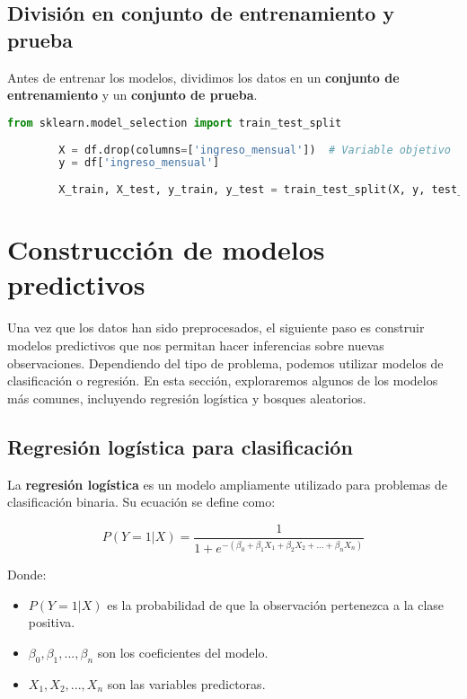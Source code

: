 \documentclass{book}
\begin{document}
	\subsection{División en conjunto de entrenamiento y prueba}
	
	Antes de entrenar los modelos, dividimos los datos en un \textbf{conjunto de entrenamiento} y un \textbf{conjunto de prueba}.
	
	\begin{lstlisting}[language=Python, caption=División en entrenamiento y prueba]
		from sklearn.model_selection import train_test_split
		
		X = df.drop(columns=['ingreso_mensual'])  # Variable objetivo
		y = df['ingreso_mensual']
		
		X_train, X_test, y_train, y_test = train_test_split(X, y, test_size=0.2, random_state=42)
	\end{lstlisting}
	
	\section{Construcción de modelos predictivos}
	
	Una vez que los datos han sido preprocesados, el siguiente paso es construir modelos predictivos que nos permitan hacer inferencias sobre nuevas observaciones. Dependiendo del tipo de problema, podemos utilizar modelos de clasificación o regresión. En esta sección, exploraremos algunos de los modelos más comunes, incluyendo regresión logística y bosques aleatorios.
	
	\subsection{Regresión logística para clasificación}
	
	La \textbf{regresión logística} es un modelo ampliamente utilizado para problemas de clasificación binaria. Su ecuación se define como:
	
	\[
	P(Y=1 | X) = \frac{1}{1 + e^{-(\beta_0 + \beta_1 X_1 + \beta_2 X_2 + \dots + \beta_n X_n)}}
	\]
	
	Donde:
	\begin{itemize}
		\item \( P(Y=1 | X) \) es la probabilidad de que la observación pertenezca a la clase positiva.
		\item \( \beta_0, \beta_1, ..., \beta_n \) son los coeficientes del modelo.
		\item \( X_1, X_2, ..., X_n \) son las variables predictoras.
	\end{itemize}
	
\end{document}
